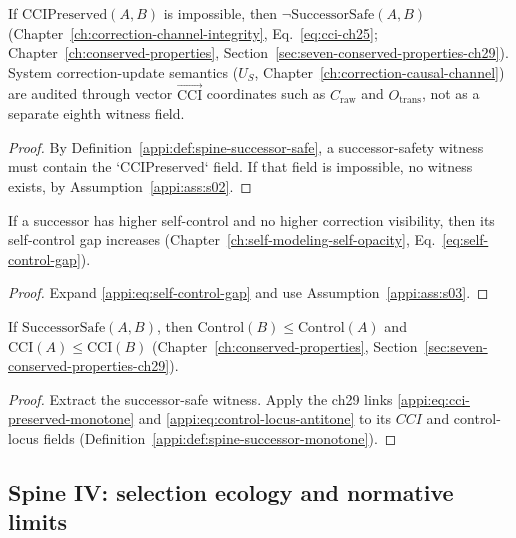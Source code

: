 \begin{theorem}
\label{appi:thm:p28}
If \(\mathrm{CCIPreserved}(A,B)\) is impossible, then \(\neg\mathrm{SuccessorSafe}(A,B)\) (Chapter~\ref{ch:correction-channel-integrity}, Eq.~\eqref{eq:cci-ch25}; Chapter~\ref{ch:conserved-properties}, Section~\ref{sec:seven-conserved-properties-ch29}).
System correction-update semantics (\(U_S\), Chapter~\ref{ch:correction-causal-channel}) are audited through vector \(\vec{\mathrm{CCI}}\) coordinates such as \(C_{\mathrm{raw}}\) and \(O_{\mathrm{trans}}\), not as a separate eighth witness field.
\end{theorem}
\begin{proof}
By Definition~\ref{appi:def:spine-successor-safe}, a successor-safety witness must contain the `CCIPreserved` field. If that field is impossible, no witness exists, by Assumption~\ref{appi:ass:s02}.
\end{proof}

\begin{lemma}
\label{appi:lem:p29}
If a successor has higher self-control and no higher correction visibility, then its self-control gap increases (Chapter~\ref{ch:self-modeling-self-opacity}, Eq.~\eqref{eq:self-control-gap}).
\end{lemma}
\begin{proof}
Expand \eqref{appi:eq:self-control-gap} and use Assumption~\ref{appi:ass:s03}.
\end{proof}

\begin{corollary}
\label{appi:cor:successor-risk-monotone}
If \(\mathrm{SuccessorSafe}(A,B)\), then \(\mathrm{Control}(B)\leq \mathrm{Control}(A)\) and \(\mathrm{CCI}(A)\leq \mathrm{CCI}(B)\) (Chapter~\ref{ch:conserved-properties}, Section~\ref{sec:seven-conserved-properties-ch29}).
\end{corollary}
\begin{proof}
Extract the successor-safe witness. Apply the ch29 links \eqref{appi:eq:cci-preserved-monotone} and \eqref{appi:eq:control-locus-antitone} to its \(CCI\) and control-locus fields (Definition~\ref{appi:def:spine-successor-monotone}).
\end{proof}

\subsection{Spine IV: selection ecology and normative limits}

